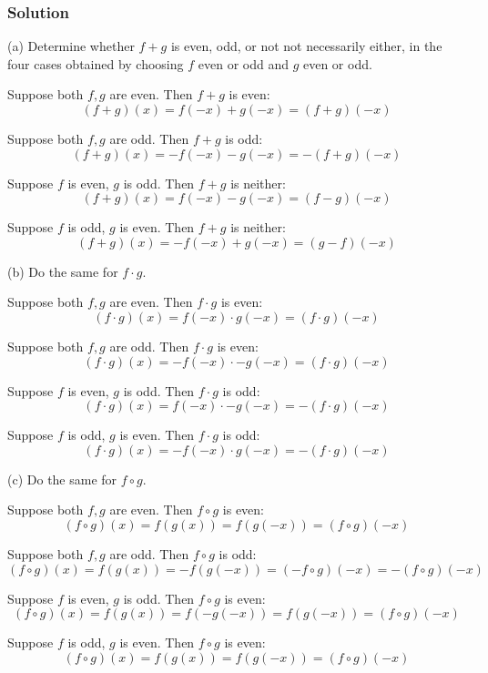 \subsubsection*{Solution}
(a) Determine whether $f+g$ is even, odd, or not not necessarily either, in the four cases obtained by choosing $f$ even or odd and $g$ even or odd.

\vs

Suppose both $f,g$ are even. Then $f+g$ is even:
\[(f+g)(x)=f(-x)+g(-x)=(f+g)(-x)\]

Suppose both $f,g$ are odd. Then $f+g$ is odd:
\[(f+g)(x)=-f(-x)-g(-x)=-(f+g)(-x)\]

Suppose $f$ is even, $g$ is odd. Then $f+g$ is neither:
\[(f+g)(x)=f(-x)-g(-x)=(f-g)(-x)\]

Suppose $f$ is odd, $g$ is even. Then $f+g$ is neither:
\[(f+g)(x)=-f(-x)+g(-x)=(g-f)(-x)\]

(b) Do the same for $f\cdot g$.

\vs

Suppose both $f,g$ are even. Then $f\cdot g$ is even:
\[(f\cdot g)(x)=f(-x)\cdot g(-x)=(f\cdot g)(-x)\]

Suppose both $f,g$ are odd. Then $f\cdot g$ is even:
\[(f\cdot g)(x)=-f(-x)\cdot -g(-x)=(f\cdot g)(-x)\]

Suppose $f$ is even, $g$ is odd. Then $f\cdot g$ is odd:
\[(f\cdot g)(x)=f(-x)\cdot -g(-x)=-(f\cdot g)(-x)\]

Suppose $f$ is odd, $g$ is even. Then $f\cdot g$ is odd:
\[(f\cdot g)(x)=-f(-x)\cdot g(-x)=-(f\cdot g)(-x)\]


(c) Do the same for $f\circ g$.

\vs

Suppose both $f,g$ are even. Then $f\circ g$ is even:
\[(f\circ g)(x)=f(g(x))=f(g(-x))=(f\circ g)(-x)\]

Suppose both $f,g$ are odd. Then $f\circ g$ is odd:
\[(f\circ g)(x)=f(g(x))=-f(g(-x))=(-f\circ g)(-x)=-(f\circ g)(-x)\]

Suppose $f$ is even, $g$ is odd. Then $f\circ g$ is even:
\[(f\circ g)(x)=f(g(x))=f(-g(-x))=f(g(-x))=(f\circ g)(-x)\]

Suppose $f$ is odd, $g$ is even. Then $f\circ g$ is even:
\[(f\circ g)(x)=f(g(x))=f(g(-x))=(f\circ g)(-x)\]

